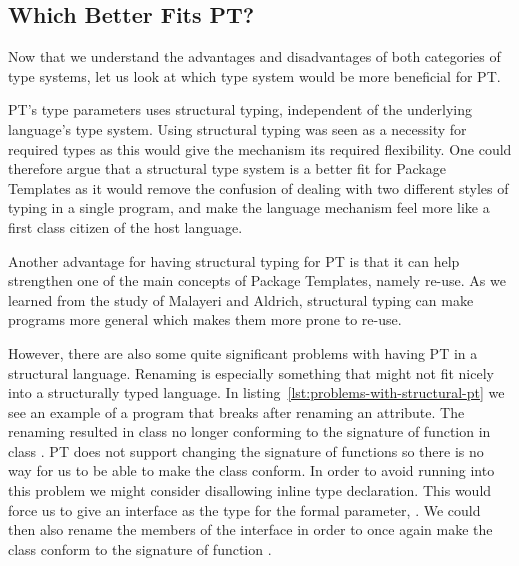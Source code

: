\subsection{Which Better Fits PT?}\label{subsec:which-better-fits-pt?}

Now that we understand the advantages and disadvantages of both categories of type systems, let us look at which type system would be more beneficial for PT\@.

PT's type parameters uses structural typing, independent of the underlying language's type system.
Using structural typing was seen as a necessity for required types as this would give the mechanism its required flexibility.
One could therefore argue that a structural type system is a better fit for Package Templates as it would remove the confusion of dealing with two different styles of typing in a single program, and make the language mechanism feel more like a first class citizen of the host language.

Another advantage for having structural typing for PT is that it can help strengthen one of the main concepts of Package Templates, namely re-use.
As we learned from the study of Malayeri and Aldrich, structural typing can make programs more general which makes them more prone to re-use.

However, there are also some quite significant problems with having PT in a structural language.
Renaming is especially something that might not fit nicely into a structurally typed language.
In listing~\vref{lst:problems-with-structural-pt} we see an example of a program that breaks after renaming an attribute.
The renaming resulted in class  no longer conforming to the signature of function  in class .
PT does not support changing the signature of functions so there is no way for us to be able to make the  class conform.
In order to avoid running into this problem we might consider disallowing inline type declaration.
This would force us to give an interface as the type for the formal parameter, .
We could then also rename the members of the interface in order to once again make the  class conform to the signature of function .

